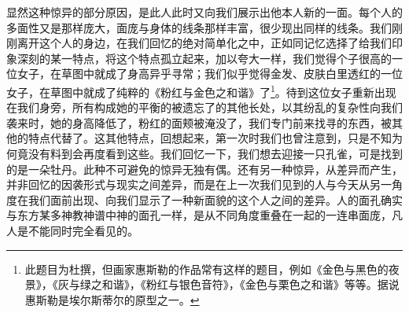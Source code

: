 \par 显然这种惊异的部分原因，是此人此时又向我们展示出他本人新的一面。每个人的多面性又是那样庞大，面庞与身体的线条那样丰富，很少现出同样的线条。我们刚刚离开这个人的身边，在我们回忆的绝对简单化之中，正如同记忆选择了给我们印象深刻的某一特点，将这个特点孤立起来，加以夸大一样，我们觉得个子很高的一位女子，在草图中就成了身高异乎寻常；我们似乎觉得金发、皮肤白里透红的一位女子，在草图中就成了纯粹的《粉红与金色之和谐》了\footnote{此题目为杜撰，但画家惠斯勒的作品常有这样的题目，例如《金色与黑色的夜景》，《灰与绿之和谐》，《粉红与银色音符》，《金色与栗色之和谐》等等。据说惠斯勒是埃尔斯蒂尔的原型之一。}。待到这位女子重新出现在我们身旁，所有构成她的平衡的被遗忘了的其他长处，以其纷乱的复杂性向我们袭来时，她的身高降低了，粉红的面颊被淹没了，我们专门前来找寻的东西，被其他的特点代替了。这其他特点，回想起来，第一次时我们也曾注意到，只是不知为何竟没有料到会再度看到这些。我们回忆一下，我们想去迎接一只孔雀，可是找到的是一朵牡丹。此种不可避免的惊异无独有偶。还有另一种惊异，从差异而产生，并非回忆的因袭形式与现实之间差异，而是在上一次我们见到的人与今天从另一角度在我们面前出现、向我们显示了一种新面貌的这个人之间的差异。人的面孔确实与东方某多神教神谱中神的面孔一样，是从不同角度重叠在一起的一连串面庞，凡人是不能同时完全看见的。
